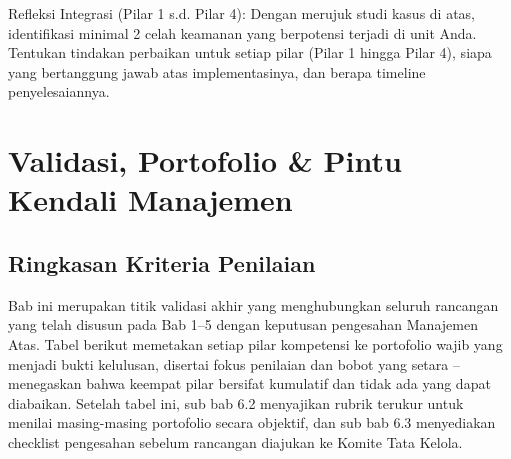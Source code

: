 \documentclass[12pt,a4paper]{report}
\begin{document}
\begin{outputbox}
Refleksi Integrasi (Pilar 1 s.d. Pilar 4): Dengan merujuk studi kasus di atas, identifikasi minimal 2 celah keamanan yang berpotensi terjadi di unit Anda. Tentukan tindakan perbaikan untuk setiap pilar (Pilar 1 hingga Pilar 4), siapa yang bertanggung jawab atas implementasinya, dan berapa timeline penyelesaiannya.
\end{outputbox}

\chapter{Validasi, Portofolio \& Pintu Kendali Manajemen}


\section{Ringkasan Kriteria Penilaian}
Bab ini merupakan titik validasi akhir yang menghubungkan seluruh rancangan yang telah disusun pada Bab 1--5 dengan keputusan pengesahan Manajemen Atas. Tabel berikut memetakan setiap pilar kompetensi ke portofolio wajib yang menjadi bukti kelulusan, disertai fokus penilaian dan bobot yang setara -- menegaskan bahwa keempat pilar bersifat kumulatif dan tidak ada yang dapat diabaikan. Setelah tabel ini, sub bab 6.2 menyajikan rubrik terukur untuk menilai masing-masing portofolio secara objektif, dan sub bab 6.3 menyediakan checklist pengesahan sebelum rancangan diajukan ke Komite Tata Kelola.
\end{document}
